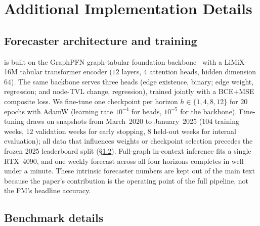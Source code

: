 \section{Additional Implementation Details}
\label{app:implementation}

\subsection{Forecaster architecture and training}
\label{ssec:fm-spec}
\fmname{} is built on the GraphPFN graph-tabular foundation
backbone~\citep{HollmannEtAl2025TabPFN,
eremeev2025turningtabularfoundationmodels} with a LiMiX-16M tabular
transformer encoder ($12$ layers, $4$ attention heads, hidden dimension
$64$). The same backbone serves three heads (edge existence, binary;
edge weight, regression; and node-TVL change, regression), trained
jointly with a BCE$+$MSE composite loss. We fine-tune one checkpoint per
horizon $h\!\in\!\{1,4,8,12\}$ for $20$ epochs with AdamW (learning rate
$10^{-4}$ for heads, $10^{-5}$ for the backbone). Fine-tuning draws on
\corpusname{} snapshots from March~2020 to January~2025 ($104$ training
weeks, $12$ validation weeks for early stopping, $8$ held-out weeks for
internal evaluation); all data that influences weights or checkpoint
selection precedes the frozen 2025 leaderboard split
(\S\ref{app:bench-details}). Full-graph in-context inference fits a single
RTX~4090, and one weekly forecast across all four horizons completes in
well under a minute. These intrinsic forecaster numbers are kept out of
the main text because the paper's contribution is the operating point of
the full pipeline, not the FM's headline accuracy.

\subsection{Benchmark details}
\label{app:bench-details}

